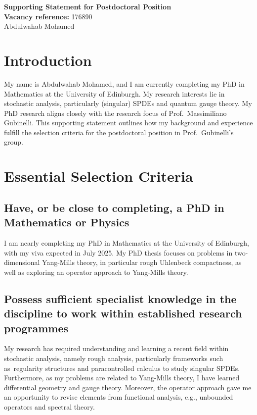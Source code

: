 \documentclass[12pt]{article}
\numberwithin{equation}{section}
\theoremstyle{definition}
\theoremstyle{remark}
\newcommand{\1}{\mathbf 1}
\newcommand{\<}{\langle}
\renewcommand{\>}{\rangle}
\begin{document}
\vspace{-10pt}
\begin{center}
    {\Large \textbf{Supporting Statement for Postdoctoral Position}} \\ \vspace{1pt}
    \textbf{Vacancy reference:} 176890\\
      Abdulwahab Mohamed \vspace{-0.5cm}
\end{center}

\section{Introduction}
My name is Abdulwahab Mohamed, and I am currently completing my PhD in Mathematics at the University of Edinburgh. My research interests lie in stochastic analysis, particularly (singular) SPDEs and quantum gauge theory. My PhD research aligns closely with the research focus of Prof.\  Massimiliano Gubinelli. This supporting statement outlines how my background and experience fulfill the selection criteria for the postdoctoral position in Prof.\ Gubinelli's group.

\section{Essential Selection Criteria}
\subsection{Have, or be close to completing, a PhD in Mathematics or Physics}
I am nearly completing my PhD in Mathematics at the University of Edinburgh, with my viva expected in July 2025. My PhD thesis focuses on problems in two-dimensional Yang-Mills theory, in particular rough Uhlenbeck compactness, as well as exploring an operator approach to Yang-Mills theory.

\subsection{Possess sufficient specialist knowledge in the discipline to work within established research programmes}
My research has required understanding and learning a recent field within stochastic analysis, namely rough analysis, particularly frameworks such as regularity structures and paracontrolled calculus to study singular SPDEs. Furthermore, as my problems are related to Yang-Mills theory, I have learned differential geometry and gauge theory. Moreover, the operator approach gave me an opportunity to revise elements from functional analysis, e.g., unbounded operators and spectral theory. 
\end{document}
